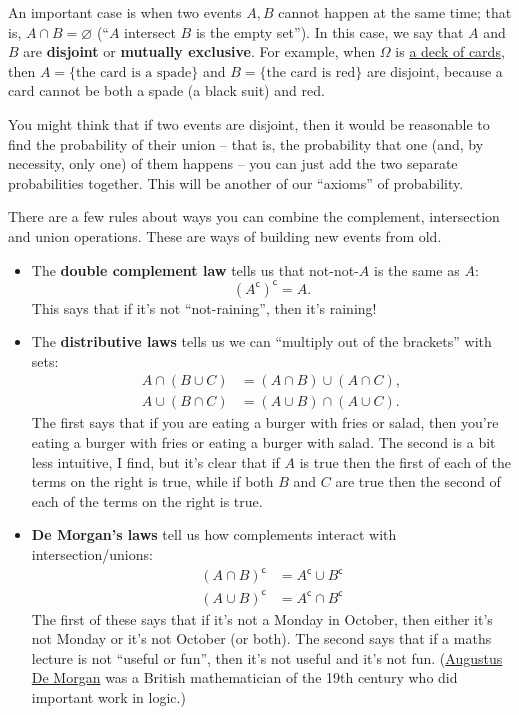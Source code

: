 \documentclass[
  a4paper,
]{book}
\providecommand{\tightlist}{%
  \setlength{\itemsep}{0pt}\setlength{\parskip}{0pt}}
\theoremstyle{definition}
\theoremstyle{definition}
\theoremstyle{definition}
\theoremstyle{definition}
\theoremstyle{remark}
\begin{document}
An important case is when two events \(A, B\) cannot happen at the same time; that is, \(A \cap B = \varnothing\) (``\(A\) intersect \(B\) is the empty set''). In this case, we say that \(A\) and \(B\) are \textbf{disjoint} or \textbf{mutually exclusive}. For example, when \(\Omega\) is \href{https://en.wikipedia.org/wiki/Standard_52-card_deck}{a deck of cards}, then \(A = \{\text{the card is a spade}\}\) and \(B = \{\text{the card is red}\}\) are disjoint, because a card cannot be both a spade (a black suit) and red.

You might think that if two events are disjoint, then it would be reasonable to find the probability of their union -- that is, the probability that one (and, by necessity, only one) of them happens -- you can just add the two separate probabilities together. This will be another of our ``axioms'' of probability.

There are a few rules about ways you can combine the complement, intersection and union operations. These are ways of building new events from old.

\begin{itemize}
\tightlist
\item
  The \textbf{double complement law} tells us that not-not-\(A\) is the same as \(A\):
  \[ (A^\mathsf{c})^\mathsf{c}= A .\]
  This says that if it's not ``not-raining'', then it's raining!
\item
  The \textbf{distributive laws} tells us we can ``multiply out of the brackets'' with sets:
  \begin{align*}
  A \cap (B \cup C) &= (A \cap B) \cup (A \cap C) ,\\
  A \cup (B \cap C) &= (A \cup B) \cap (A \cup C) .
  \end{align*}
  The first says that if you are eating a burger with fries or salad, then you're eating a burger with fries or eating a burger with salad. The second is a bit less intuitive, I find, but it's clear that if \(A\) is true then the first of each of the terms on the right is true, while if both \(B\) and \(C\) are true then the second of each of the terms on the right is true.
\item
  \textbf{De Morgan's laws} tell us how complements interact with intersection/unions:
  \begin{align*}
  (A \cap B)^\mathsf{c}&= A^\mathsf{c}\cup B^\mathsf{c}\\
  (A \cup B)^\mathsf{c}&= A^\mathsf{c}\cap B^\mathsf{c}
  \end{align*}
  The first of these says that if it's not a Monday in October, then either it's not Monday or it's not October (or both). The second says that if a maths lecture is not ``useful or fun'', then it's not useful and it's not fun. (\href{https://mathshistory.st-andrews.ac.uk/Biographies/De_Morgan/}{Augustus De Morgan} was a British mathematician of the 19th century who did important work in logic.)
\end{itemize}
\end{document}
